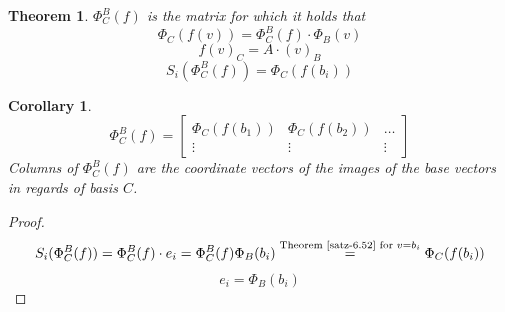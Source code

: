 \documentclass[a4paper,landscape,twocolumn]{article}
\newtheorem{theorem}{Theorem}[section]
\newtheorem{cor}{Corollary}[section]
\begin{document}
\begin{theorem}
  \label{satz-6.52}
  $\Phi_C^B(f)$ is the matrix for which it holds that
  \[ \Phi_C(f(v)) = \Phi_C^B(f) \cdot \Phi_B(v) \]
  \[ f(v)_C = A \cdot (v)_B \]
  \[ S_i(\Phi_C^B(f)) = \Phi_C(f(b_i)) \]
\end{theorem}

\begin{cor}
  \label{corollary-6.53}
  \[
    \Phi_C^B(f) =
    \begin{bmatrix}
      \Phi_C(f(b_1)) & \Phi_C(f(b_2)) & \ldots \\
      \vdots & \vdots & \vdots
    \end{bmatrix}
  \]
  Columns of $\Phi_C^B(f)$ are the coordinate vectors of the images of the base vectors in regards of basis $C$.
\end{cor}
\begin{proof}
  \[
    S_i(\Phi_C^B(f))
    = \Phi_C^B(f) \cdot e_i
    = \Phi_C^B(f) \Phi_B(b_i)
    \overset{\text{Theorem~\ref{satz-6.52} for } v = b_i}{=} \Phi_C(f(b_i))
  \] \[
    e_i = \Phi_B(b_i)
  \]
\end{proof}
\end{document}
